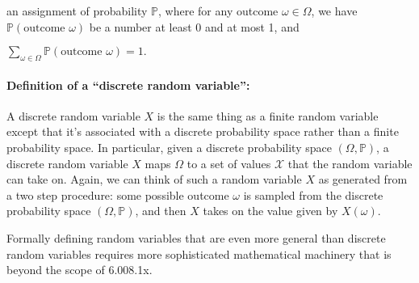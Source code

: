 \documentclass[6008notes.tex]{subfiles}
\begin{document}
an assignment of probability $\mathbb {P}$, where for any outcome $\omega \in \Omega$, we have $\mathbb {P}(\text {outcome }\omega )$ be a number at least 0 and at most 1, and

{\centering$\sum _{\omega \in \Omega }\mathbb {P}(\text {outcome }\omega )=1.$ \par}
 
\paragraph{Definition of a ``discrete random variable'':} A discrete random variable $X$ is the same thing as a finite random variable except that it's associated with a discrete probability space rather than a finite probability space. In particular, given a discrete probability space $(\Omega ,\mathbb {P})$, a discrete random variable $X$ maps $\Omega$ to a set of values $\mathcal{X}$ that the random variable can take on. Again, we can think of such a random variable $X$ as generated from a two step procedure: some possible outcome $\omega$ is sampled from the discrete probability space $(\Omega ,\mathbb {P})$, and then $X$ takes on the value given by $X(\omega)$.

Formally defining random variables that are even more general than discrete random variables requires more sophisticated mathematical machinery that is beyond the scope of 6.008.1x.
\end{document}
